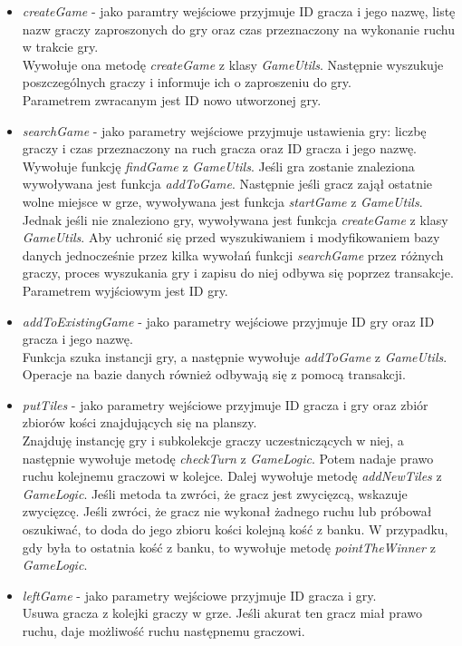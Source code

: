 \begin{itemize}
	\item \emph{createGame} - jako paramtry wejściowe przyjmuje ID gracza i jego nazwę, listę nazw graczy zaproszonych do gry oraz czas przeznaczony na wykonanie ruchu w trakcie gry. \\
	Wywołuje ona metodę \emph{createGame} z klasy \emph{GameUtils}. Następnie wyszukuje poszczególnych graczy i informuje ich o zaproszeniu do gry. \\
	Parametrem zwracanym jest ID nowo utworzonej gry.
	\item \emph{searchGame} - jako parametry wejściowe przyjmuje ustawienia gry: liczbę graczy i czas przeznaczony na ruch gracza oraz ID gracza i jego nazwę. \\ 
	Wywołuje funkcję \emph{findGame} z \emph{GameUtils}. Jeśli gra zostanie znaleziona wywoływana jest funkcja \emph{addToGame}. Następnie jeśli gracz zajął ostatnie wolne miejsce w grze, wywoływana jest funkcja \emph{startGame} z \emph{GameUtils}. Jednak jeśli nie znaleziono gry, wywoływana jest funkcja \emph{createGame} z klasy \emph{GameUtils}.	Aby uchronić się przed wyszukiwaniem i modyfikowaniem bazy danych jednocześnie przez kilka wywołań funkcji \emph{searchGame} przez różnych graczy, proces wyszukania gry i zapisu do niej odbywa się poprzez transakcje. \\
	Parametrem wyjściowym jest ID gry.
	\item \emph{addToExistingGame} - jako parametry wejściowe przyjmuje ID gry oraz ID gracza i jego nazwę. \\
	Funkcja szuka instancji gry, a następnie wywołuje \emph{addToGame} z \emph{GameUtils}. Operacje na bazie danych również odbywają się z pomocą transakcji.
	\item \emph{putTiles} - jako parametry wejściowe przyjmuje ID gracza i gry oraz zbiór zbiorów kości znajdujących się na planszy. \\
	Znajduję instancję gry i subkolekcje graczy uczestniczących w niej, a następnie wywołuje metodę \emph{checkTurn} z \emph{GameLogic}. Potem nadaje prawo ruchu kolejnemu graczowi w kolejce. Dalej wywołuje metodę \emph{addNewTiles} z \emph{GameLogic}. Jeśli metoda ta zwróci, że gracz jest zwycięzcą, wskazuje zwycięzcę. Jeśli zwróci, że gracz nie wykonał żadnego ruchu lub próbował oszukiwać, to doda do jego zbioru kości kolejną kość z banku. W przypadku, gdy była to ostatnia kość z banku, to wywołuje metodę \emph{pointTheWinner} z \emph{GameLogic}.
	\item \emph{leftGame} - jako parametry wejściowe przyjmuje ID gracza i gry. \\
	Usuwa gracza z kolejki graczy w grze. Jeśli akurat ten gracz miał prawo ruchu, daje możliwość ruchu następnemu graczowi. \\
\end{itemize}
